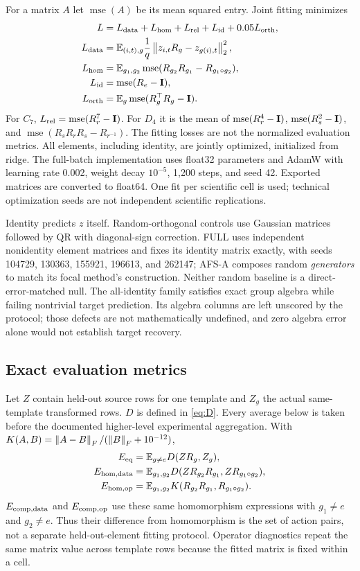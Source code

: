 For a matrix $A$ let $\operatorname{mse}(A)$ be its mean squared entry. Joint fitting minimizes
\begin{align*}
 L&=L_{\rm data}+L_{\rm hom}+L_{\rm rel}+L_{\rm id}+0.05L_{\rm orth},\\
 L_{\rm data}&=\mathbb{E}_{(i,t),g}\frac{1}{q}\left\lVert z_{i,t}R_g-z_{g(i),t}\right\rVert_2^2,\\
 L_{\rm hom}&=\mathbb{E}_{g_1,g_2}\operatorname{mse}(R_{g_2}R_{g_1}-R_{g_1\circ g_2}),\\
 L_{\rm id}&=\operatorname{mse}(R_e-\mathbf{I}),\\
 L_{\rm orth}&=\mathbb{E}_g\operatorname{mse}(R_g^\top R_g-\mathbf{I}).
\end{align*}
For $C_7$, $L_{\rm rel}=\operatorname{mse}(R_r^7-\mathbf{I})$. For $D_4$ it is the mean of $\operatorname{mse}(R_r^4-\mathbf{I})$, $\operatorname{mse}(R_s^2-\mathbf{I})$, and $\operatorname{mse}(R_sR_rR_s-R_{r^{-1}})$. The fitting losses are not the normalized evaluation metrics. All elements, including identity, are jointly optimized, initialized from ridge. The full-batch implementation uses float32 parameters and AdamW with learning rate 0.002, weight decay $10^{-5}$, 1,200 steps, and seed 42. Exported matrices are converted to float64. One fit per scientific cell is used; technical optimization seeds are not independent scientific replications.

Identity predicts $z$ itself. Random-orthogonal controls use Gaussian matrices followed by QR with diagonal-sign correction. FULL uses independent nonidentity element matrices and fixes its identity matrix exactly, with seeds 104729, 130363, 155921, 196613, and 262147; AFS-A composes random \emph{generators} to match its focal method's construction. Neither random baseline is a direct-error-matched null. The all-identity family satisfies exact group algebra while failing nontrivial target prediction. Its algebra columns are left unscored by the protocol; those defects are not mathematically undefined, and zero algebra error alone would not establish target recovery.

\subsection{Exact evaluation metrics}
\label{app:metrics}
Let $Z$ contain held-out source rows for one template and $Z_g$ the actual same-template transformed rows. $D$ is defined in \cref{eq:D}. Every average below is taken before the documented higher-level experimental aggregation. With $K(A,B)=\left\lVert A-B\right\rVert_F/(\left\lVert B\right\rVert_F+10^{-12})$,
\begin{align*}
 E_{\mathrm{eq}}&=\mathbb{E}_{g\ne e}D(ZR_g,Z_g),\\
 E_{\mathrm{hom,data}}&=\mathbb{E}_{g_1,g_2}D(ZR_{g_2}R_{g_1},ZR_{g_1\circ g_2}),\\
 E_{\mathrm{hom,op}}&=\mathbb{E}_{g_1,g_2}K(R_{g_2}R_{g_1},R_{g_1\circ g_2}).
\end{align*}
$E_{\mathrm{comp,data}}$ and $E_{\mathrm{comp,op}}$ use these same homomorphism expressions with $g_1\ne e$ and $g_2\ne e$. Thus their difference from homomorphism is the set of action pairs, not a separate held-out-element fitting protocol. Operator diagnostics repeat the same matrix value across template rows because the fitted matrix is fixed within a cell.

